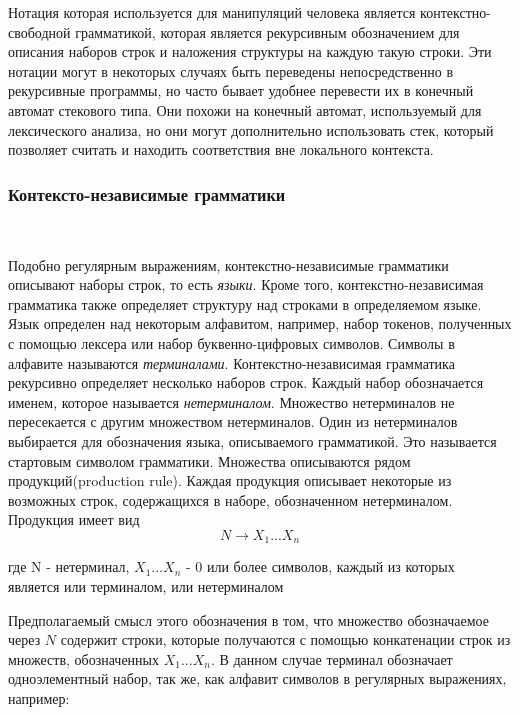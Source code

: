 Нотация которая используется для манипуляций человека является контекстно-свободной грамматикой, которая является рекурсивным обозначением для описания наборов строк и наложения структуры на каждую такую строки. Эти нотации могут в некоторых случаях быть переведены непосредственно в рекурсивные программы, но часто бывает удобнее перевести их в конечный автомат стекового типа. Они похожи на конечный автомат, используемый для лексического анализа, но они могут дополнительно использовать стек, который позволяет считать и находить соответствия вне локального контекста.
\subsubsection{Контексто-независимые грамматики}~
\label{sub:arch_and_mod:grammars}

Подобно регулярным выражениям, контекстно-независимые грамматики описывают наборы строк, то есть \textit{языки}. Кроме того, контекстно-независимая грамматика также определяет структуру над строками в определяемом языке. Язык определен над некоторым алфавитом, например, набор токенов, полученных с помощью лексера или набор буквенно-цифровых символов. Символы в алфавите называются \textit{терминалами}. Контекстно-независимая грамматика рекурсивно определяет несколько наборов строк. Каждый набор обозначается именем, которое называется \textit{нетерминалом}. Множество нетерминалов не пересекается с другим множеством нетерминалов. Один из нетерминалов выбирается для обозначения языка, описываемого грамматикой. Это называется стартовым символом грамматики. Множества описываются рядом продукций(production rule). Каждая продукция описывает некоторые из возможных строк, содержащихся в наборе, обозначенном нетерминалом. Продукция имеет вид
\begin{equation}
  N \rightarrow X_1...X_n
\end{equation}
\begin{explanation}
где N - нетерминал, $X_1...X_n$ - 0 или более символов, каждый из которых \\
    является или терминалом, или нетерминалом
\end{explanation}

Предполагаемый смысл этого обозначения в том, что множество обозначаемое через $N$ содержит строки, которые получаются с помощью конкатенации строк из множеств, обозначенных
$X_1...X_n$. В данном случае терминал обозначает одноэлементный набор, так же, как алфавит символов в регулярных выражениях, например:


